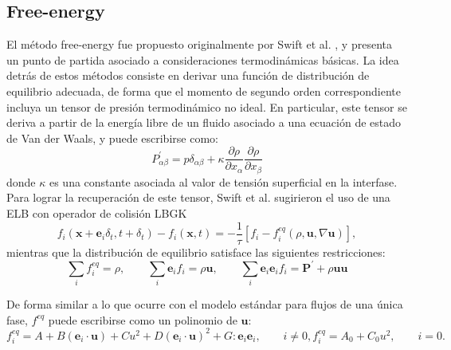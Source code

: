 \subsection*{Free-energy}
El m\'etodo free-energy fue propuesto originalmente por Swift et al. \cite{swift_lattice_1996}, y presenta un punto de partida asociado a consideraciones termodin\'amicas b\'asicas. La idea detr\'as de estos m\'etodos consiste en derivar una funci\'on de distribuci\'on de equilibrio adecuada, de forma que el momento de segundo orden correspondiente incluya un tensor de presi\'on termodin\'amico no ideal. En particular, este tensor se deriva a partir de la energ\'ia libre de un fluido asociado a una ecuaci\'on de estado de Van der Waals, y puede escribirse como:
\begin{equation}
	P^{'}_{\alpha\beta}=p\delta_{\alpha\beta}+\kappa\dfrac{\partial \rho}{\partial x_{\alpha}}\dfrac{\partial \rho}{\partial x_{\beta}}
\end{equation}
donde $\kappa$ es una constante asociada al valor de tensi\'on superficial en la interfase. Para lograr la recuperaci\'on de este tensor, Swift et al. sugirieron el uso de una ELB con operador de colisi\'on LBGK
\begin{equation}
	f_i(\bm{x}+\bm{e}_i\delta_t,t+\delta_t) - f_i(\bm{x},t) = -\dfrac{1}{\tau}\left[ f_i - f_i^{eq}(\rho, \bm{u}, \nabla\bm{u}) \right],
\end{equation}
mientras que la distribuci\'on de equilibrio satisface las siguientes restricciones:
\begin{equation}
	\sum_i f_i^{eq} = \rho, \qquad \sum_i \bm{e}_if_{i}=\rho\bm{u}, \qquad
	\sum_i \bm{e}_i\bm{e}_if_{i}= \bm{P}^{'}+\rho\bm{u}\bm{u}
	\label{eq:free_energy+rest}
\end{equation}

De forma similar a lo que ocurre con el modelo est\'andar para flujos de una \'unica fase, $f^{eq}$ puede escribirse como un polinomio de $\bm{u}$:
\begin{subequations}
	\begin{equation}
		f_i^{eq}=A + B(\bm{e}_i \cdot \bm{u}) + C u^2 + D(\bm{e}_i \cdot \bm{u})^2 + G:\bm{e}_i\bm{e}_i, \qquad i\neq 0,
	\end{equation}
	\begin{equation}
		f_i^{eq}=A_0 + C_0 u^2, \qquad i = 0.
	\end{equation}
\end{subequations}

